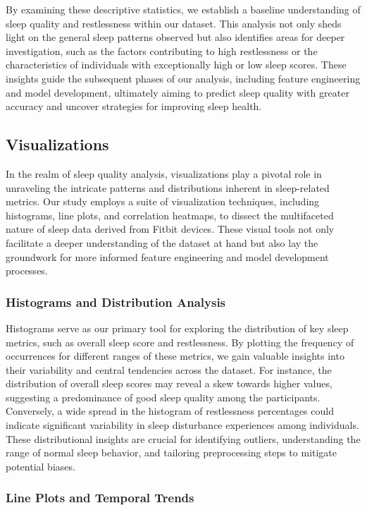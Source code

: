 \documentclass[10pt]{extarticle}
\begin{document}
By examining these descriptive statistics, we establish a baseline understanding of sleep quality and restlessness within our dataset. This analysis not only sheds light on the general sleep patterns observed but also identifies areas for deeper investigation, such as the factors contributing to high restlessness or the characteristics of individuals with exceptionally high or low sleep scores. These insights guide the subsequent phases of our analysis, including feature engineering and model development, ultimately aiming to predict sleep quality with greater accuracy and uncover strategies for improving sleep health.

\subsection{Visualizations}

In the realm of sleep quality analysis, visualizations play a pivotal role in unraveling the intricate patterns and distributions inherent in sleep-related metrics. Our study employs a suite of visualization techniques, including histograms, line plots, and correlation heatmaps, to dissect the multifaceted nature of sleep data derived from Fitbit devices. These visual tools not only facilitate a deeper understanding of the dataset at hand but also lay the groundwork for more informed feature engineering and model development processes.

\subsubsection{Histograms and Distribution Analysis}

Histograms serve as our primary tool for exploring the distribution of key sleep metrics, such as overall sleep score and restlessness. By plotting the frequency of occurrences for different ranges of these metrics, we gain valuable insights into their variability and central tendencies across the dataset. For instance, the distribution of overall sleep scores may reveal a skew towards higher values, suggesting a predominance of good sleep quality among the participants. Conversely, a wide spread in the histogram of restlessness percentages could indicate significant variability in sleep disturbance experiences among individuals. These distributional insights are crucial for identifying outliers, understanding the range of normal sleep behavior, and tailoring preprocessing steps to mitigate potential biases.

\subsubsection{Line Plots and Temporal Trends}
\end{document}
